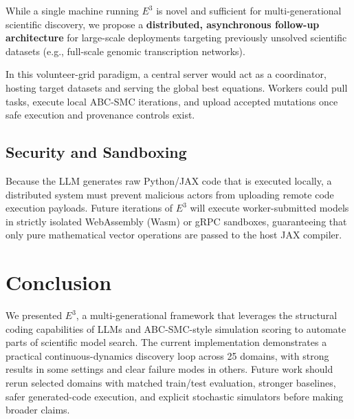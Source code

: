 While a single machine running $E^3$ is novel and sufficient for multi-generational scientific discovery, we propose a \textbf{distributed, asynchronous follow-up architecture} for large-scale deployments targeting previously unsolved scientific datasets (e.g., full-scale genomic transcription networks).

In this volunteer-grid paradigm, a central server would act as a coordinator, hosting target datasets and serving the global best equations. Workers could pull tasks, execute local ABC-SMC iterations, and upload accepted mutations once safe execution and provenance controls exist.

\subsection{Security and Sandboxing}
Because the LLM generates raw Python/JAX code that is executed locally, a distributed system must prevent malicious actors from uploading remote code execution payloads. Future iterations of $E^3$ will execute worker-submitted models in strictly isolated WebAssembly (Wasm) or gRPC sandboxes, guaranteeing that only pure mathematical vector operations are passed to the host JAX compiler.

\section{Conclusion}
\label{sec:conclusion}

We presented $E^3$, a multi-generational framework that leverages the structural coding capabilities of LLMs and ABC-SMC-style simulation scoring to automate parts of scientific model search. The current implementation demonstrates a practical continuous-dynamics discovery loop across 25 domains, with strong results in some settings and clear failure modes in others. Future work should rerun selected domains with matched train/test evaluation, stronger baselines, safer generated-code execution, and explicit stochastic simulators before making broader claims.
